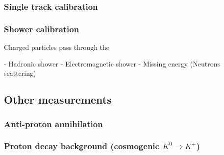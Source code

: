 \subsubsection{Single track calibration}
\subsubsection{Shower calibration}

Charged particles pass through the 

- Hadronic shower
- Electromagnetic shower
- Missing energy (Neutrons scattering)
 

\subsection{Other measurements} 
\subsubsection{Anti-proton annihilation }
\subsubsection{Proton decay background (cosmogenic $K^{0} \to K^+$)}



